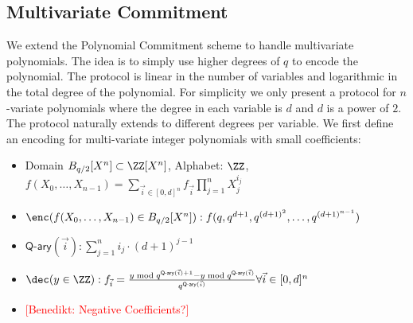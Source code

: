 \documentclass{article}
\theoremstyle{definition}
\newcommand{\benedikt}[1]{{\textcolor{red}{[Benedikt: #1]}}}
\newcommand{\benedikt}[1]{}
\begin{document}
\subsection{Multivariate Commitment}
  We extend the Polynomial Commitment scheme to handle multivariate polynomials. The idea is to simply use higher degrees of $q$ to encode the polynomial. The protocol is linear in the number of variables and logarithmic in the total degree of the polynomial. For simplicity we only present a protocol for $n$-variate polynomials where the degree in each variable is $d$ and $d$ is a power of $2$. The protocol naturally extends to different degrees per variable.
We first define an encoding for multi-variate integer polynomials with small coefficients:
 \begin{itemize}
	\item Domain $B_{q/2}[X^n] \subset \ZZ[X^n]$, Alphabet: $\ZZ$, \\$f(X_0,\dots,X_{n-1})=\sum_{\vec{i} \in [0,d]^n} f_{\vec{i}} \prod_{j=1}^{n} X_j^{i_j}$
	\item $\enc(f(X_0,\dots,X_{n-1}) \in B_{q/2}[X^n]): f(q,q^{d+1},q^{(d+1)^2},\dots,q^{(d+1)^{n-1}})$
	\item $\textsf{Q-ary}(\vec{i}):\sum_{j=1}^{n} i_j\cdot (d+1)^{j-1}$
	\item $\dec(y \in \ZZ): f_{\vec{i}}=\frac{y \bmod q^{\textsf{Q-ary}(\vec{i})+1}-y \bmod q^{\textsf{Q-ary}(\vec{i})}}{q^{\textsf{Q-ary}(\vec{i})}} \forall \vec{i} \in [0,d]^n$
	\item \benedikt{Negative Coefficients?}

\end{itemize}
\end{document}
